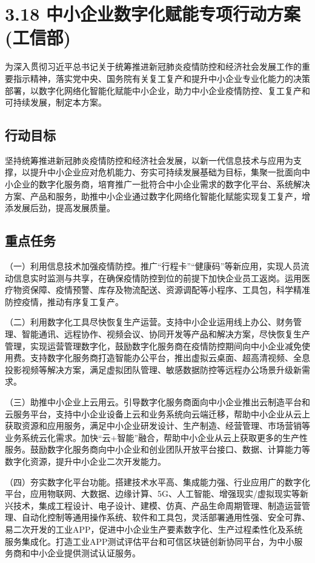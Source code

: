 \chapter{3.18 中小企业数字化赋能专项行动方案(工信部)} %

为深入贯彻习近平总书记关于统筹推进新冠肺炎疫情防控和经济社会发展工作的重要指示精神，落实党中央、国务院有关复工复产和提升中小企业专业化能力的决策部署，以数字化网络化智能化赋能中小企业，助力中小企业疫情防控、复工复产和可持续发展，制定本方案。

\section{行动目标}

坚持统筹推进新冠肺炎疫情防控和经济社会发展，以新一代信息技术与应用为支撑，以提升中小企业应对危机能力、夯实可持续发展基础为目标，集聚一批面向中小企业的数字化服务商，培育推广一批符合中小企业需求的数字化平台、系统解决方案、产品和服务，助推中小企业通过数字化网络化智能化赋能实现复工复产，增添发展后劲，提高发展质量。

\section{重点任务}

（一）利用信息技术加强疫情防控。推广“行程卡”“健康码”等新应用，实现人员流动信息实时监测与共享，在确保疫情防控到位的前提下加快企业员工返岗。运用医疗物资保障、疫情预警、库存及物流配送、资源调配等小程序、工具包，科学精准防控疫情，推动有序复工复产。

（二）利用数字化工具尽快恢复生产运营。支持中小企业运用线上办公、财务管理、智能通讯、远程协作、视频会议、协同开发等产品和解决方案，尽快恢复生产管理，实现运营管理数字化，鼓励数字化服务商在疫情防控期间向中小企业减免使用费。支持数字化服务商打造智能办公平台，推出虚拟云桌面、超高清视频、全息投影视频等解决方案，满足虚拟团队管理、敏感数据防控等远程办公场景升级新需求。

（三）助推中小企业上云用云。引导数字化服务商面向中小企业推出云制造平台和云服务平台，支持中小企业设备上云和业务系统向云端迁移，帮助中小企业从云上获取资源和应用服务，满足中小企业研发设计、生产制造、经营管理、市场营销等业务系统云化需求。加快“云+智能”融合，帮助中小企业从云上获取更多的生产性服务。鼓励数字化服务商向中小企业和创业团队开放平台接口、数据、计算能力等数字化资源，提升中小企业二次开发能力。

（四）夯实数字化平台功能。搭建技术水平高、集成能力强、行业应用广的数字化平台，应用物联网、大数据、边缘计算、5G、人工智能、增强现实/虚拟现实等新兴技术，集成工程设计、电子设计、建模、仿真、产品生命周期管理、制造运营管理、自动化控制等通用操作系统、软件和工具包，灵活部署通用性强、安全可靠、易二次开发的工业APP，促进中小企业生产要素数字化、生产过程柔性化及系统服务集成化。打造工业APP测试评估平台和可信区块链创新协同平台，为中小服务商和中小企业提供测试认证服务。


